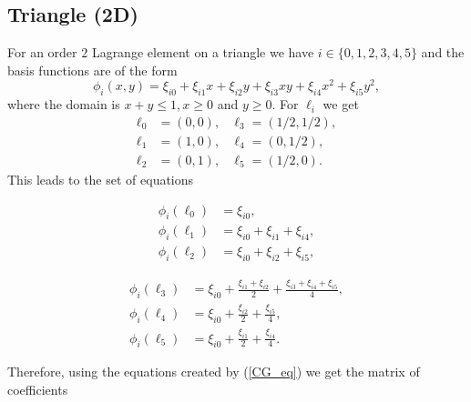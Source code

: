 \documentclass[12pt]{ociamthesis}
\begin{document}
\subsection{Triangle (2D)}
For an order $2$ Lagrange element on a triangle we have $i \in \{0, 1, 2,3,4,5\}$ and the basis functions are of the form
\begin{equation}
\phi_i(x,y) = \xi_{i0} + \xi_{i1} x + \xi_{i2} y + \xi_{i3} xy + \xi_{i4} x^2 + \xi_{i5}y^2,
\end{equation}
where the domain is $x+y\leq 1, x \geq 0$ and $y\geq 0$. For $\ell_i$ we get
\begin{align}
\ell_0 &= (0,0), &\ell_3 = (1/2,1/2), \\
\ell_1 &= (1,0), &\ell_4 = (0,1/2), \\
\ell_2 &= (0,1), &\ell_5 = (1/2,0).
\end{align}
This leads to the set of equations
\begin{figure}[H]
 \begin{subfigure}{0.4\textwidth}
 \begin{align}
\phi_i(\ell_0) &= \xi_{i0}, \\
\phi_i(\ell_1) &= \xi_{i0} + \xi_{i1} + \xi_{i4}, \\
\phi_i(\ell_2) &= \xi_{i0} + \xi_{i2} + \xi_{i5},
 \end{align}
 \end{subfigure}
 \hfill
 \begin{subfigure}{0.6\textwidth}
 \begin{align}
 \phi_i(\ell_3) &= \xi_{i0} + \frac{\xi_{i1}+\xi_{i2}}{2} + \frac{\xi_{i3} + \xi_{i4} + \xi_{i5}}{4}, \\
 \phi_i(\ell_4) &= \xi_{i0} + \frac{\xi_{i2}}{2} + \frac{\xi_{i5}}{4},\\
 \phi_i(\ell_5) &= \xi_{i0} + \frac{\xi_{i1}}{2} + \frac{\xi_{i4}}{4}.
 \end{align}
 \end{subfigure}
 \hfill
\end{figure}
Therefore, using the equations created by (\ref{CG_eq}) we get the matrix of coefficients
\end{document}
